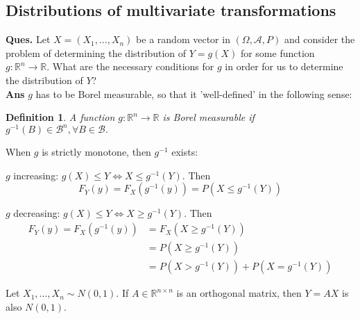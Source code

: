 \documentclass[12pt]{report} \addtolength{\textheight}{2in}
\newtheorem{defn}{Definition}
\newcommand{\Borel}{\mathscr{B}}
\newcommand{\Realnum}{\mathbb{R}}
\newcommand{\bigA}{\mathcal{A}}
\newcommand{\probsp}{(\Omega, \bigA, P)}
\begin{document}
\subsection*{Distributions of multivariate transformations}
\textbf{Ques.} Let $X=(X_1,\dots,X_n)$ be a random vector in $\probsp$ and consider the problem of determining the distribution of $Y=g(X)$ for some function $g: \Realnum^n \to \Realnum.$ What are the necessary conditions for $g$ in order for us to determine the distribution of $Y$? \\
\textbf{Ans} $g$ has to be Borel measurable, so that it 'well-defined' in the following sense:
\begin{defn}
A function $g: \Realnum^n \to \Realnum$ is Borel measurable if $g^{-1}(B) \in \Borel^n, \forall B \in \Borel.$
\end{defn}

\begin{description}
\item [\underline{A simple, particular case}:]
\item When $g$ is strictly monotone, then $g^{-1}$ exists:
\item[Case 1] $g$ increasing: $g(X) \leq Y \iff X \leq g^{-1} (Y)$. Then
\begin{displaymath}
F_{Y}(y) = F_{X} (g^{-1}(y)) = P(X \leq g^{-1} (Y))
\end{displaymath}
\item[Case 2] $g$ decreasing: $g(X) \leq Y \iff X \geq g^{-1} (Y)$. Then
\begin{align*}
F_{Y}(y) = F_{X} (g^{-1}(y))&=F_{X}(X \geq g^{-1}(Y))\\
&= P(X \geq g^{-1}(Y))\\
&=P(X> g^{-1}(Y))+P(X=g^{-1}(Y))
\end{align*}
\item[\underline{Another example:}]
 Let $X_1,\dots, X_n \sim N(0,1)$.
 If $A \in \Realnum^{n \times n}$ is an orthogonal matrix, then $Y=A X$ is also $N(0,1).$
\end{description}
\end{document}
